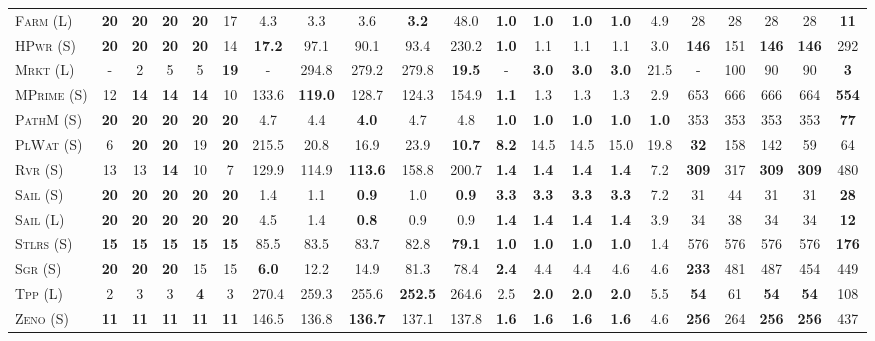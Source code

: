 \documentclass[11pt,landscape]{article}
\begin{document}
\begin{table}[tb]
{\begin{tabular}{|l||ccccc||ccccc||ccccc||ccccc||}
\textsc{Farm} (L)&\textbf{20}&\textbf{20}&\textbf{20}&\textbf{20}&17&4.3&3.3&3.6&\textbf{3.2}&48.0&\textbf{1.0}&\textbf{1.0}&\textbf{1.0}&\textbf{1.0}&4.9&28&28&28&28&\textbf{11}\\
\textsc{HPwr} (S)&\textbf{20}&\textbf{20}&\textbf{20}&\textbf{20}&14&\textbf{17.2}&97.1&90.1&93.4&230.2&\textbf{1.0}&1.1&1.1&1.1&3.0&\textbf{146}&151&\textbf{146}&\textbf{146}&292\\
\textsc{Mrkt} (L)&-&2&5&5&\textbf{19}&-&294.8&279.2&279.8&\textbf{19.5}&-&\textbf{3.0}&\textbf{3.0}&\textbf{3.0}&21.5&-&100&90&90&\textbf{3}\\
\textsc{MPrime} (S)&12&\textbf{14}&\textbf{14}&\textbf{14}&10&133.6&\textbf{119.0}&128.7&124.3&154.9&\textbf{1.1}&1.3&1.3&1.3&2.9&653&666&666&664&\textbf{554}\\
\textsc{PathM} (S)&\textbf{20}&\textbf{20}&\textbf{20}&\textbf{20}&\textbf{20}&4.7&4.4&\textbf{4.0}&4.7&4.8&\textbf{1.0}&\textbf{1.0}&\textbf{1.0}&\textbf{1.0}&\textbf{1.0}&353&353&353&353&\textbf{77}\\
\textsc{PlWat} (S)&6&\textbf{20}&\textbf{20}&19&\textbf{20}&215.5&20.8&16.9&23.9&\textbf{10.7}&\textbf{8.2}&14.5&14.5&15.0&19.8&\textbf{32}&158&142&59&64\\
\textsc{Rvr} (S)&13&13&\textbf{14}&10&7&129.9&114.9&\textbf{113.6}&158.8&200.7&\textbf{1.4}&\textbf{1.4}&\textbf{1.4}&\textbf{1.4}&7.2&\textbf{309}&317&\textbf{309}&\textbf{309}&480\\
\textsc{Sail} (S)&\textbf{20}&\textbf{20}&\textbf{20}&\textbf{20}&\textbf{20}&1.4&1.1&\textbf{0.9}&1.0&\textbf{0.9}&\textbf{3.3}&\textbf{3.3}&\textbf{3.3}&\textbf{3.3}&7.2&31&44&31&31&\textbf{28}\\
\textsc{Sail} (L)&\textbf{20}&\textbf{20}&\textbf{20}&\textbf{20}&\textbf{20}&4.5&1.4&\textbf{0.8}&0.9&0.9&\textbf{1.4}&\textbf{1.4}&\textbf{1.4}&\textbf{1.4}&3.9&34&38&34&34&\textbf{12}\\
\textsc{Stlrs} (S)&\textbf{15}&\textbf{15}&\textbf{15}&\textbf{15}&\textbf{15}&85.5&83.5&83.7&82.8&\textbf{79.1}&\textbf{1.0}&\textbf{1.0}&\textbf{1.0}&\textbf{1.0}&1.4&576&576&576&576&\textbf{176}\\
\textsc{Sgr} (S)&\textbf{20}&\textbf{20}&\textbf{20}&15&15&\textbf{6.0}&12.2&14.9&81.3&78.4&\textbf{2.4}&4.4&4.4&4.6&4.6&\textbf{233}&481&487&454&449\\
\textsc{Tpp} (L)&2&3&3&\textbf{4}&3&270.4&259.3&255.6&\textbf{252.5}&264.6&2.5&\textbf{2.0}&\textbf{2.0}&\textbf{2.0}&5.5&\textbf{54}&61&\textbf{54}&\textbf{54}&108\\
\textsc{Zeno} (S)&\textbf{11}&\textbf{11}&\textbf{11}&\textbf{11}&\textbf{11}&146.5&136.8&\textbf{136.7}&137.1&137.8&\textbf{1.6}&\textbf{1.6}&\textbf{1.6}&\textbf{1.6}&4.6&\textbf{256}&264&\textbf{256}&\textbf{256}&437\\

\end{tabular}}
\end{table}
\end{document}
